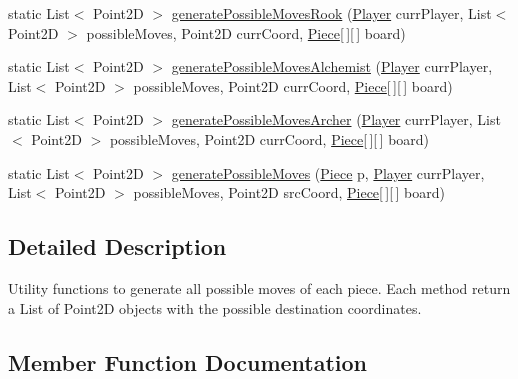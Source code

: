 \begin{DoxyCompactItemize}
\item 
static List$<$ Point2D $>$ \mbox{\hyperlink{classcom_1_1chess_1_1logic_1_1_move_a646b1f2c156b808d1e5e052c37b94c8c}{generate\+Possible\+Moves\+Rook}} (\mbox{\hyperlink{classcom_1_1chess_1_1logic_1_1_player}{Player}} curr\+Player, List$<$ Point2D $>$ possible\+Moves, Point2D curr\+Coord, \mbox{\hyperlink{classcom_1_1chess_1_1pieces_1_1_piece}{Piece}}\mbox{[}$\,$\mbox{]}\mbox{[}$\,$\mbox{]} board)
\item 
static List$<$ Point2D $>$ \mbox{\hyperlink{classcom_1_1chess_1_1logic_1_1_move_a852dabdab65f3590b98071b928475190}{generate\+Possible\+Moves\+Alchemist}} (\mbox{\hyperlink{classcom_1_1chess_1_1logic_1_1_player}{Player}} curr\+Player, List$<$ Point2D $>$ possible\+Moves, Point2D curr\+Coord, \mbox{\hyperlink{classcom_1_1chess_1_1pieces_1_1_piece}{Piece}}\mbox{[}$\,$\mbox{]}\mbox{[}$\,$\mbox{]} board)
\item 
static List$<$ Point2D $>$ \mbox{\hyperlink{classcom_1_1chess_1_1logic_1_1_move_a17a27bd18e1307c67487fb53e57b10ae}{generate\+Possible\+Moves\+Archer}} (\mbox{\hyperlink{classcom_1_1chess_1_1logic_1_1_player}{Player}} curr\+Player, List$<$ Point2D $>$ possible\+Moves, Point2D curr\+Coord, \mbox{\hyperlink{classcom_1_1chess_1_1pieces_1_1_piece}{Piece}}\mbox{[}$\,$\mbox{]}\mbox{[}$\,$\mbox{]} board)
\item 
static List$<$ Point2D $>$ \mbox{\hyperlink{classcom_1_1chess_1_1logic_1_1_move_a8ef601d6fd56dd999125d37807079008}{generate\+Possible\+Moves}} (\mbox{\hyperlink{classcom_1_1chess_1_1pieces_1_1_piece}{Piece}} p, \mbox{\hyperlink{classcom_1_1chess_1_1logic_1_1_player}{Player}} curr\+Player, List$<$ Point2D $>$ possible\+Moves, Point2D src\+Coord, \mbox{\hyperlink{classcom_1_1chess_1_1pieces_1_1_piece}{Piece}}\mbox{[}$\,$\mbox{]}\mbox{[}$\,$\mbox{]} board)
\end{DoxyCompactItemize}


\subsection{Detailed Description}
Utility functions to generate all possible moves of each piece. Each method return a List of Point2D objects with the possible destination coordinates. 

\subsection{Member Function Documentation}
\mbox{\label{classcom_1_1chess_1_1logic_1_1_move_a8ef601d6fd56dd999125d37807079008}} 
